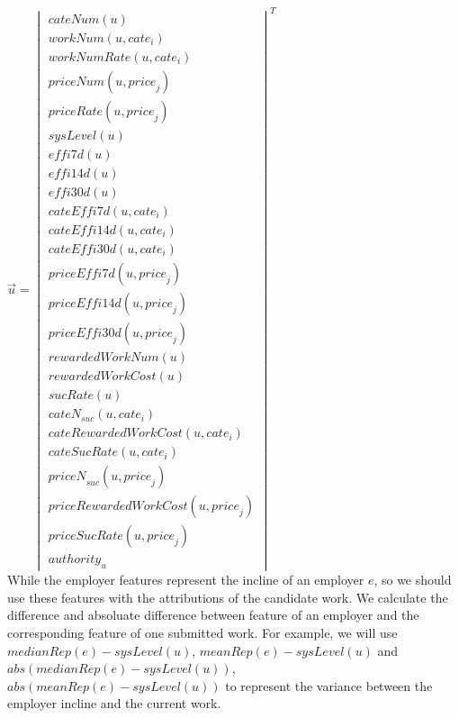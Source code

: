 \documentclass{sig-alternate-05-2015}
\begin{document}
$\vec{u}={\begin{vmatrix} 
cateNum(u)\\
workNum(u,{cate}_{i})\\
workNumRate(u,{cate}_{i})\\
priceNum(u,{price}_{j})\\
priceRate(u,{price}_{j})\\
sysLevel(u)\\
effi7d(u)\\
effi14d(u)\\
effi30d(u)\\
cateEffi7d(u,{cate}_{i})\\
cateEffi14d(u,{cate}_{i})\\
cateEffi30d(u,{cate}_{i})\\
priceEffi7d(u,{price}_{j})\\
priceEffi14d(u,{price}_{j})\\
priceEffi30d(u,{price}_{j})\\
rewardedWorkNum(u)\\
rewardedWorkCost(u)\\
sucRate(u)\\
{cateN}_{suc}(u,{cate}_{i})\\
cateRewardedWorkCost(u,{cate}_{i})\\%
cateSucRate(u,{cate}_{i})\\
{priceN}_{suc}(u,{price}_{j})\\
priceRewardedWorkCost(u,{price}_{j})\\%
priceSucRate(u,{price}_{j})\\
{authority}_{u}
\end{vmatrix} }^{ T }$\\
While the employer features represent the incline of an employer $e$, so we should use these features with the attributions of the candidate work. We calculate the difference and absoluate difference between feature of an employer and the corresponding feature of one submitted work. For example, we will use $medianRep(e)-sysLevel(u)$, $meanRep(e)-sysLevel(u)$ and $abs(medianRep(e)-sysLevel(u))$, \\ $abs(meanRep(e)-sysLevel(u))$ to represent the variance between the employer incline and the current work.\\
\end{document}
